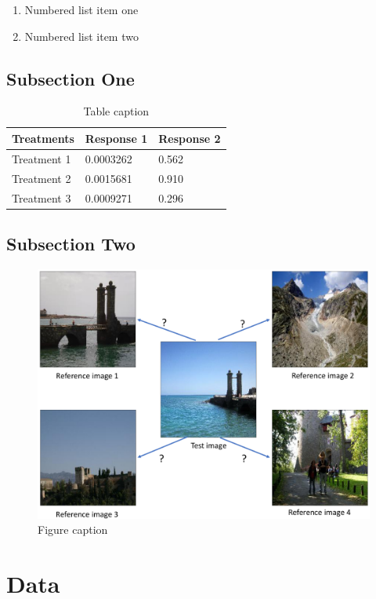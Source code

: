 \documentclass[final,3p]{elsarticle}
\begin{document}
\begin{enumerate}
\item Numbered list item one
\item Numbered list item two
\end{enumerate}

\subsection{Subsection One}

\begin{table}[h]
\centering
\begin{tabular}{l l l}
\hline
\textbf{Treatments} & \textbf{Response 1} & \textbf{Response 2}\\
\hline
Treatment 1 & 0.0003262 & 0.562 \\
Treatment 2 & 0.0015681 & 0.910 \\
Treatment 3 & 0.0009271 & 0.296 \\
\hline
\end{tabular}
\caption{Table caption}
\end{table}

\subsection{Subsection Two}

\begin{figure}[hbtp]
\centering\includegraphics[width=0.8\linewidth]{./figures/problem.pdf}
\caption{Figure caption}
\label{fig:problem}
\end{figure}

\section{Data}
\label{S:3}
\end{document}
